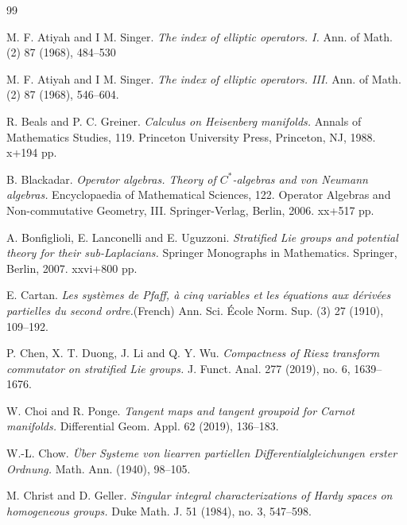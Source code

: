 \documentclass[leqno]{amsart}
\begin{document}
\begin{thebibliography}{99}

M. F. Atiyah and I M. Singer. 
{\it The index of elliptic operators. I.} 
Ann. of Math. (2) 87 (1968), 484--530


M. F. Atiyah and I M. Singer. 
{\it The index of elliptic operators. III.} 
Ann. of Math. (2) 87 (1968), 546--604.

R. Beals and P. C. Greiner. 
{\it Calculus on Heisenberg manifolds.} 
Annals of Mathematics Studies, 119. Princeton University Press, Princeton, NJ, 1988. x+194 pp.

B. Blackadar.
{\it Operator algebras. Theory of $C^{\ast}$-algebras and von Neumann algebras.} Encyclopaedia of Mathematical Sciences, 122. Operator Algebras and Non-commutative Geometry, III. Springer-Verlag, Berlin, 2006. xx+517 pp.

A. Bonfiglioli, E. Lanconelli and E. Uguzzoni. 
{\it Stratified Lie groups and potential theory for their sub-Laplacians.} 
Springer Monographs in Mathematics. Springer, Berlin, 2007. xxvi+800 pp.

E. Cartan.
{\it Les syst\`emes de {Pfaff,} \`a cinq variables et les \'equations aux d\'eriv\'ees partielles du second ordre.}(French)
Ann. Sci. École Norm. Sup. (3) 27 (1910), 109--192.

P. Chen, X. T. Duong, J. Li and Q. Y. Wu. 
{\it Compactness of Riesz transform commutator on stratified Lie groups.} 
J. Funct. Anal. 277 (2019), no. 6, 1639--1676. 

W. Choi and R. Ponge. 
{\it Tangent maps and tangent groupoid for Carnot manifolds.} 
Differential Geom. Appl. 62 (2019), 136--183.

W.-L. Chow.
{\it \"Uber Systeme von liearren partiellen Differentialgleichungen erster Ordnung.}
Math. Ann. (1940), 98--105.

M. Christ and D. Geller. 
{\it Singular integral characterizations of Hardy spaces on homogeneous groups.} 
Duke Math. J. 51 (1984), no. 3, 547--598.




\end{thebibliography}
\end{document}
